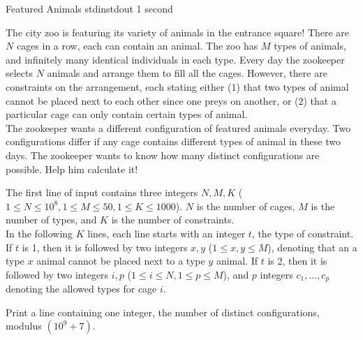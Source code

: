 \begin{problem}{Featured Animals}
{stdin}{stdout}
{1 second}{}{}

The city zoo is featuring its variety of animals in the entrance square! There are $N$ cages in a row, each can contain an animal. The zoo has $M$ types of animals, and infinitely many identical individuals in each type. Every day the zookeeper selects $N$ animals and arrange them to fill all the cages. However, there are constraints on the arrangement, each stating either (1) that two types of animal cannot be placed next to each other since one preys on another, or (2) that a particular cage can only contain certain types of animal. \\

The zookeeper wants a different configuration of featured animals everyday. Two configurations differ if any cage contains different types of animal in these two days. The zookeeper wants to know how many distinct configurations are possible. Help him calculate it! 

\InputFile

The first line of input contains three integers $N, M, K$ ($1 \le N \le 10^8, 1 \le M \le 50, 1 \le K \le 1000$). $N$ is the number of cages, $M$ is the number of types, and $K$ is the number of constraints. \\
In the following $K$ lines, each line starts with an integer $t$, the type of constraint. If $t$ is 1, then it is followed by two integers $x, y$ ($1 \le x, y \le M$), denoting that an a type $x$ animal cannot be placed next to a type $y$ animal. If $t$ is 2, then it is followed by two integers $i, p$ ($1 \le i \le N, 1 \le p \le M$), and $p$ integers $c_1, \hdots, c_p$ denoting the allowed types for cage $i$. 

\OutputFile

Print a line containing one integer, the number of distinct configurations, modulus $(10^9+7)$. 

\Examples

\begin{example}
\exmp{

}{%

}%
\end{example}

\end{problem}
